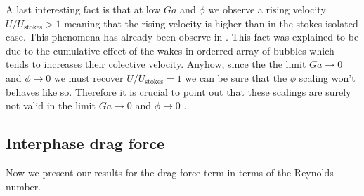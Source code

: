A last interesting fact is that at low $Ga$ and $\phi$ we observe a rising velocity $U / U_\text{stokes} > 1$ meaning that the rising velocity is higher than in the stokes isolated case. 
This phenomena has already been observe in \citet{loisy2017buoyancy}. 
This fact was explained to be due to the cumulative effect of the wakes in orderred array of bubbles  which tends to increases their colective velocity. 
Anyhow, since the the limit $Ga \rightarrow 0$ and $\phi \rightarrow 0$ we must recover $U/U_\text{stokes} = 1$ we can be sure that the $\phi$ scaling won't behaves like so.
Therefore it is crucial to point out that these scalings are surely not valid in the limit  $Ga \rightarrow 0$ and $\phi \rightarrow 0$ .

\subsection{Interphase drag force}
Now we present our results for the drag force term in terms of the Reynolds number. 
